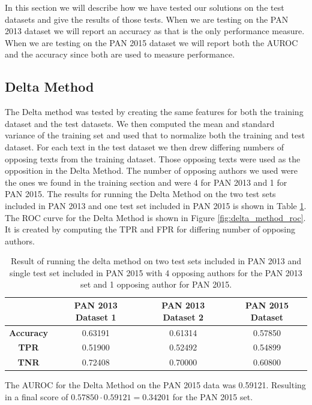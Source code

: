 In this section we will describe how we have tested our solutions on the test
datasets and give the results of those tests. When we are testing on the PAN
2013 dataset we will report an accuracy as that is the only performance measure.
When we are testing on the PAN 2015 dataset we will report both the \gls{AUROC}
and the accuracy since both are used to measure performance.

\subsection{Delta Method} \label{subsec:results:delta_method}

The Delta method was tested by creating the same features for both the training
dataset and the test datasets. We then computed the mean and standard variance
of the training set and used that to normalize both the training and test
dataset. For each text in the test dataset we then drew differing numbers of
opposing texts from the training dataset. Those opposing texts were used as
the opposition in the Delta Method. The number of opposing authors we used
were the ones we found in the training section and were 4 for PAN 2013 and 1
for PAN 2015. The results for running the Delta Method on the two test sets
included in PAN 2013 and one test set included in PAN 2015 is shown in Table
\ref{tab:delta_method_final_results}. The \gls{ROC} curve for the Delta Method
is shown in Figure \ref{fig:delta_method_roc}. It is created by computing the
\gls{TPR} and \gls{FPR} for differing number of opposing authors.

\begin{table}
    \centering
    \begin{tabular}{c|ccc}
        & \textbf{PAN 2013 Dataset 1} & \textbf{PAN 2013 Dataset 2} & \textbf{PAN 2015 Dataset}\\
        \hline
        \textbf{Accuracy}  & 0.63191 & 0.61314 & 0.57850 \\
        \textbf{\gls{TPR}} & 0.51900 & 0.52492 & 0.54899 \\
        \textbf{\gls{TNR}} & 0.72408 & 0.70000 & 0.60800
    \end{tabular}
    \caption{Result of running the delta method on two test sets included in PAN
    2013 and single test set included in PAN 2015 with 4 opposing authors for
    the PAN 2013 set and 1 opposing author for PAN 2015.}
    \label{tab:delta_method_final_results}
\end{table}

The \gls{AUROC} for the Delta Method on the PAN 2015 data was 0.59121. Resulting
in a final score of $0.57850 \cdot 0.59121 = 0.34201$ for the PAN 2015 set.

